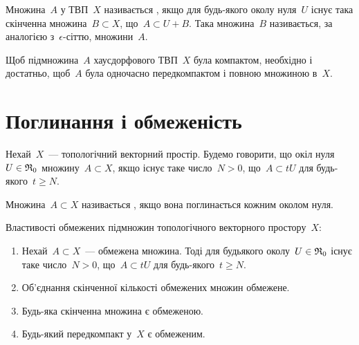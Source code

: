 \begin{definition}
    Множина~$A$ у ТВП~$X$ називається , якщо для будь-якого околу нуля~$U$ існує така скінченна множина~$B \subset X$, що~$A \subset U + B$. Така множина~$B$ називається, за аналогією з~$\epsilon$-сіттю,  множини~$A$.
\end{definition}

\begin{theorem}
    Щоб підмножина~$A$ хаусдорфового ТВП~$X$ була компактом, необхідно і достатньо, щоб~$A$ була одночасно передкомпактом і повною множиною в~$X$.
\end{theorem}

\section{Поглинання і обмеженість}

\begin{definition}
    Нехай~$X$~--- топологічний векторний простір. Будемо говорити, що окіл нуля~$U \in \frak R_0$  множину~$A \subset X$, якщо існує таке число~$N > 0$, що~$A \subset t U$ для будь-якого~$t \ge N$.
\end{definition}

\begin{definition}
    Множина~$A \subset X$ називається , якщо вона поглинається кожним околом нуля.
\end{definition}

\begin{theorem}
    Властивості обмежених підмножин топологічного векторного простору~$X$:
    \begin{enumerate}
        \item Нехай~$A \subset X$~--- обмежена множина. Тоді для будьякого околу~$U \in \frak R_0$ існує таке число~$N > 0$, що~$A \subset t U$ для будь-якого~$t \ge N$.
        \item Об'єднання скінченної кількості обмежених множин обмежене.
        \item Будь-яка скінченна множина є обмеженою.
        \item Будь-який передкомпакт у~$X$ є обмеженим.
    \end{enumerate}
\end{theorem}

